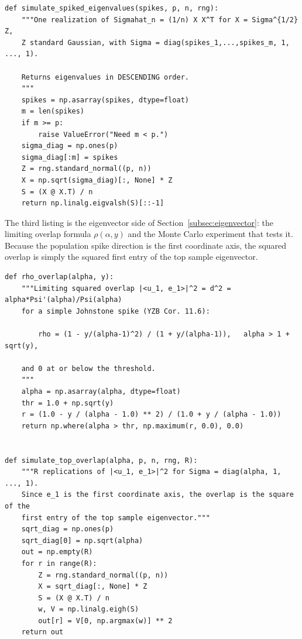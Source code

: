 \begin{lstlisting}[caption={One realization of the spiked sample spectrum (from \texttt{04\_section4\_demos.py}; drives the figures of Sections~\ref{subsec:johnstone} to~\ref{subsec:fluctuations}).}, label={lst:spiked-sim}]
def simulate_spiked_eigenvalues(spikes, p, n, rng):
    """One realization of Sigmahat_n = (1/n) X X^T for X = Sigma^{1/2} Z,
    Z standard Gaussian, with Sigma = diag(spikes_1,...,spikes_m, 1, ..., 1).

    Returns eigenvalues in DESCENDING order.
    """
    spikes = np.asarray(spikes, dtype=float)
    m = len(spikes)
    if m >= p:
        raise ValueError("Need m < p.")
    sigma_diag = np.ones(p)
    sigma_diag[:m] = spikes
    Z = rng.standard_normal((p, n))
    X = np.sqrt(sigma_diag)[:, None] * Z
    S = (X @ X.T) / n
    return np.linalg.eigvalsh(S)[::-1]
\end{lstlisting}

The third listing is the eigenvector side of Section~\ref{subsec:eigenvector}: the limiting overlap formula \(\rho(\alpha, y)\) and the Monte Carlo experiment that tests it. Because the population spike direction is the first coordinate axis, the squared overlap is simply the squared first entry of the top sample eigenvector.

\begin{lstlisting}[caption={Eigenvector overlap: theory and simulation (from \texttt{04\_section4\_demos.py}; drives the figures of Section~\ref{subsec:eigenvector}).}, label={lst:overlap-sim}]
def rho_overlap(alpha, y):
    """Limiting squared overlap |<u_1, e_1>|^2 = d^2 = alpha*Psi'(alpha)/Psi(alpha)
    for a simple Johnstone spike (YZB Cor. 11.6):

        rho = (1 - y/(alpha-1)^2) / (1 + y/(alpha-1)),   alpha > 1 + sqrt(y),

    and 0 at or below the threshold.
    """
    alpha = np.asarray(alpha, dtype=float)
    thr = 1.0 + np.sqrt(y)
    r = (1.0 - y / (alpha - 1.0) ** 2) / (1.0 + y / (alpha - 1.0))
    return np.where(alpha > thr, np.maximum(r, 0.0), 0.0)


def simulate_top_overlap(alpha, p, n, rng, R):
    """R replications of |<u_1, e_1>|^2 for Sigma = diag(alpha, 1, ..., 1).
    Since e_1 is the first coordinate axis, the overlap is the square of the
    first entry of the top sample eigenvector."""
    sqrt_diag = np.ones(p)
    sqrt_diag[0] = np.sqrt(alpha)
    out = np.empty(R)
    for r in range(R):
        Z = rng.standard_normal((p, n))
        X = sqrt_diag[:, None] * Z
        S = (X @ X.T) / n
        w, V = np.linalg.eigh(S)
        out[r] = V[0, np.argmax(w)] ** 2
    return out
\end{lstlisting}

